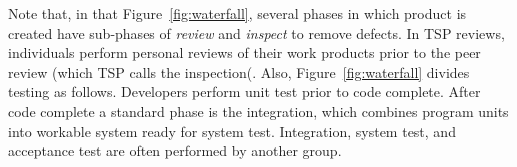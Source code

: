  


Note that, in that Figure~\ref{fig:waterfall},
several  phases in which product is created have sub-phases of {\em review} and {\em inspect} to remove defects.
In TSP  reviews,  individuals perform personal reviews of their work products prior to the peer review
(which TSP calls the inspection(.
Also, Figure~\ref{fig:waterfall} divides  testing     as follows. Developers perform unit test prior to code complete.  After code complete a standard phase is the integration, which combines program units into workable system ready for system test. Integration,  system test, and acceptance test are often performed by another group. 

